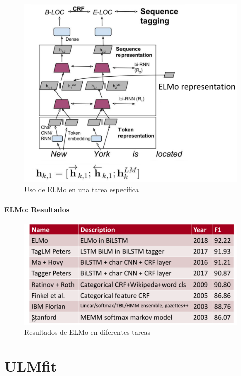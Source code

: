 \begin{figure}[h]
  \centering
  \includegraphics[scale=0.25]{pics/elmo2.png}
  \caption{Uso de ELMo en una tarea específica}
\end{figure}

\paragraph{ELMo: Resultados}

\begin{figure}[h]
  \centering
  \includegraphics[scale=0.25]{pics/elmo_results.png}
  \caption{Resultados de ELMo en diferentes tareas}
\end{figure}

\section{ULMfit}


